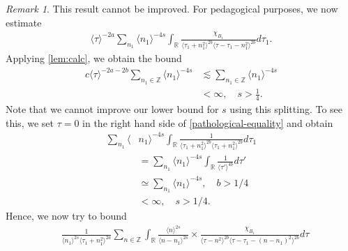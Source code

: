 \documentclass[12pt,reqno]{amsart}
\numberwithin{equation}{section}  %
\numberwithin{figure}{section}
\newcommand{\rr}{\mathbb{R}}
\newcommand{\zz}{\mathbb{Z}}
\theoremstyle{plain}
\theoremstyle{definition}
\theoremstyle{remark}
\newtheorem{remark}{Remark}
\begin{document}
\begin{framed}
  \begin{remark}
    This result cannot be improved. For pedagogical purposes, we now estimate 
%
%
\begin{equation}
  \label{pathological-equality}
\begin{split}
   \langle \tau \rangle ^{-2a} \sum_{n_{1}} \langle
  n_{1}\rangle ^{-4s} \int_{\rr} \frac{\chi_{B_{1}}}{\langle \tau_{1} + n_{1}^{2} \rangle ^{2b}\langle
  \tau - \tau_{1} - n_{1}^{2}\rangle ^{2b}}d \tau_{1}.
\end{split}
\end{equation}
Applying \autoref{lem:calc}, we obtain the bound
%
%
\begin{equation*}
\begin{split}
  c  \langle \tau \rangle
  ^{-2a-2b} \sum_{n_{1} \in \zz} \langle n_{1} \rangle
  ^{-4s} 
  & \lesssim \sum_{n_{1} \in \zz} \langle n_{1} \rangle ^{-4s}
  \\
  & < \infty, \quad s > \frac{1}{4}.
\end{split}
\end{equation*}
%
%
Note that we cannot improve our lower bound for $s$ using this splitting.
To see this, we set $\tau = 0$
in the right hand side of \eqref{pathological-equality} and obtain
%
%
\newpage
%
\begin{equation*}
\begin{split}
   \sum_{n_{1}} \langle
  & n_{1}\rangle ^{-4s} \int_{\rr} \frac{1}{\langle \tau_{1} + n_{1}^{2} \rangle ^{2b}\langle
   \tau_{1} + n_{1}^{2}\rangle ^{2b}}d \tau_{1} 
   \\
   & = \sum_{n_{1}} \langle
  n_{1}\rangle ^{-4s} \int_{\rr} \frac{1}{\langle
   \tau' \rangle ^{4b}}d \tau'
   \\
   & \simeq \sum_{n_{1}} \langle n_{1} \rangle ^{-4s}, \quad b > 1/4
   \\
   & < \infty, \quad s > 1/4.
\end{split}
\end{equation*}
%
%
%
Hence, we now try to bound
\begin{equation}
\begin{split}
  & \frac{1}{\langle n_{1} \rangle ^{2s}
  \langle \tau_{1} + n_{1}^{2} \rangle
  ^{2a}} \sum_{n \in \zz } \int_{\rr} \frac{\langle n \rangle ^{2s}}{\langle
  n - n_{1}\rangle ^{2s}}  \times \frac{\chi_{B_{1}}}{\langle
  \tau - n^{2}  \rangle ^{2b} \langle \tau - \tau_{1} - (n - n_{1})^{2}
  \rangle ^{2b}} d \tau 
\end{split}

\end{equation}
\end{remark}
\end{framed}
\end{document}
